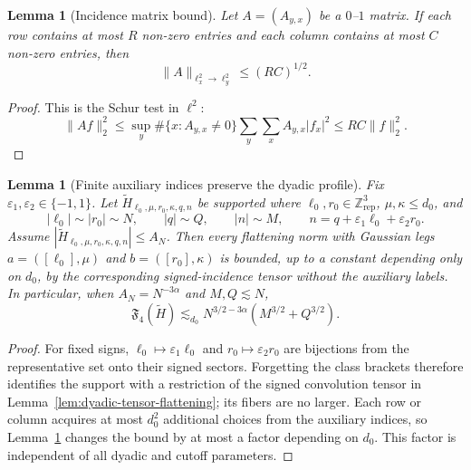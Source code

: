 \documentclass[10pt]{amsart}
\numberwithin{equation}{section}
\theoremstyle{plain}
\newtheorem{lemma}[theorem]{Lemma}
\theoremstyle{definition}
\theoremstyle{remark}
\begin{document}
\begin{lemma}[Incidence matrix bound]\label{lem:incidence-matrix}
Let $A=(A_{y,x})$ be a $0$--$1$ matrix.  If each row contains at most $R$ non-zero entries and each column contains at most $C$ non-zero entries, then
\[
        \|A\|_{\ell^2_x\to\ell^2_y}\le (RC)^{1/2}.
\]
\end{lemma}

\begin{proof}
This is the Schur test in $\ell^2$:
\[
\|Af\|_2^2
\le \sup_y\#\{x:A_{y,x}\ne0\}\sum_y\sum_x A_{y,x}|f_x|^2
\le RC\|f\|_2^2.
\]
\end{proof}


\begin{lemma}[Finite auxiliary indices preserve the dyadic profile]\label{lem:auxiliary-index-flattening}
Fix $\varepsilon_1,\varepsilon_2\in\{-1,1\}$.  Let $\widetilde H_{\ell_0,\mu,r_0,\kappa,q,n}$ be supported where $\ell_0,r_0\in\mathbb Z^3_{\mathrm{rep}}$, $\mu,\kappa\le d_0$, and
\[
        |\ell_0|\sim |r_0|\sim N,
        \qquad |q|\sim Q,
        \qquad |n|\sim M,
        \qquad n=q+\varepsilon_1\ell_0+\varepsilon_2r_0.
\]
Assume $|\widetilde H_{\ell_0,\mu,r_0,\kappa,q,n}|\le A_N$.  Then every flattening norm with Gaussian legs $a=([\ell_0],\mu)$ and $b=([r_0],\kappa)$ is bounded, up to a constant depending only on $d_0$, by the corresponding signed-incidence tensor without the auxiliary labels.  In particular, when $A_N=N^{-3\alpha}$ and $M,Q\lesssim N$,
\[
        \mathfrak F_4(\widetilde H)
        \lesssim_{d_0}
        N^{3/2-3\alpha}(M^{3/2}+Q^{3/2}).
\]
\end{lemma}

\begin{proof}
For fixed signs, $\ell_0\mapsto\varepsilon_1\ell_0$ and $r_0\mapsto\varepsilon_2r_0$ are bijections from the representative set onto their signed sectors.  Forgetting the class brackets therefore identifies the support with a restriction of the signed convolution tensor in Lemma~\ref{lem:dyadic-tensor-flattening}; its fibers are no larger.  Each row or column acquires at most $d_0^2$ additional choices from the auxiliary indices, so Lemma~\ref{lem:incidence-matrix} changes the bound by at most a factor depending on $d_0$.  This factor is independent of all dyadic and cutoff parameters.
\end{proof}
\end{document}
